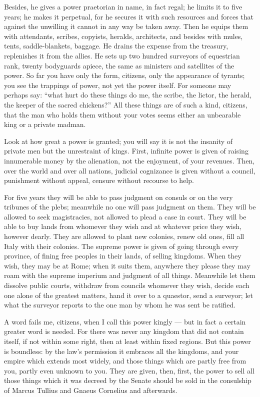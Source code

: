  Besides, he gives a power praetorian in name, in fact regal; he limits it to five years; he makes it perpetual, for he secures it with such resources and forces that against the unwilling it cannot in any way be taken away. Then he equips them with attendants, scribes, copyists, heralds, architects, and besides with mules, tents, saddle-blankets, baggage. He drains the expense from the treasury, replenishes it from the allies. He sets up two hundred surveyors of equestrian rank, twenty bodyguards apiece, the same as ministers and satellites of the power. So far you have only the form, citizens, only the appearance of tyrants; you see the trappings of power, not yet the power itself. For someone may perhaps say: ``what hurt do these things do me, the scribe, the lictor, the herald, the keeper of the sacred chickens?'' All these things are of such a kind, citizens, that the man who holds them without your votes seems either an unbearable king or a private madman.

 Look at how great a power is granted; you will say it is not the insanity of private men but the unrestraint of kings. First, infinite power is given of raising innumerable money by the alienation, not the enjoyment, of your revenues. Then, over the world and over all nations, judicial cognizance is given without a council, punishment without appeal, censure without recourse to help.

 For five years they will be able to pass judgment on consuls or on the very tribunes of the plebs; meanwhile no one will pass judgment on them. They will be allowed to seek magistracies, not allowed to plead a case in court. They will be able to buy lands from whomever they wish and at whatever price they wish, however dearly. They are allowed to plant new colonies, renew old ones, fill all Italy with their colonies. The supreme power is given of going through every province, of fining free peoples in their lands, of selling kingdoms. When they wish, they may be at Rome; when it suits them, anywhere they please they may roam with the supreme imperium and judgment of all things. Meanwhile let them dissolve public courts, withdraw from councils whomever they wish, decide each one alone of the greatest matters, hand it over to a quaestor, send a surveyor; let what the surveyor reports to the one man by whom he was sent be ratified.

 A word fails me, citizens, when I call this power kingly --- but in fact a certain greater word is needed. For there was never any kingdom that did not contain itself, if not within some right, then at least within fixed regions. But this power is boundless: by the law's permission it embraces all the kingdoms, and your empire which extends most widely, and those things which are partly free from you, partly even unknown to you. They are given, then, first, the power to sell all those things which it was decreed by the Senate should be sold in the consulship of Marcus Tullius and Gnaeus Cornelius and afterwards.

